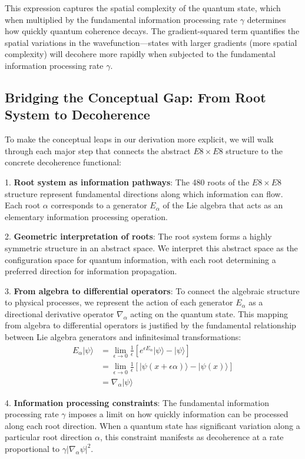 \documentclass[11pt,english,twoside]{article}
\begin{document}
This expression captures the spatial complexity of the quantum state, which when multiplied by the fundamental information processing rate $\gamma$ determines how quickly quantum coherence decays. The gradient-squared term quantifies the spatial variations in the wavefunction—states with larger gradients (more spatial complexity) will decohere more rapidly when subjected to the fundamental information processing rate $\gamma$.

\subsection{Bridging the Conceptual Gap: From Root System to Decoherence}

To make the conceptual leaps in our derivation more explicit, we will walk through each major step that connects the abstract $E8\times E8$ structure to the concrete decoherence functional:

1. \textbf{Root system as information pathways}: The 480 roots of the $E8\times E8$ structure represent fundamental directions along which information can flow. Each root $\alpha$ corresponds to a generator $E_\alpha$ of the Lie algebra that acts as an elementary information processing operation.

2. \textbf{Geometric interpretation of roots}: The root system forms a highly symmetric structure in an abstract space. We interpret this abstract space as the configuration space for quantum information, with each root determining a preferred direction for information propagation.

3. \textbf{From algebra to differential operators}: To connect the algebraic structure to physical processes, we represent the action of each generator $E_\alpha$ as a directional derivative operator $\nabla_\alpha$ acting on the quantum state. This mapping from algebra to differential operators is justified by the fundamental relationship between Lie algebra generators and infinitesimal transformations:
   \begin{align}
   E_\alpha|\psi\rangle &= \lim_{\epsilon \to 0} \frac{1}{\epsilon}[e^{\epsilon E_\alpha}|\psi\rangle - |\psi\rangle]\\
   &= \lim_{\epsilon \to 0} \frac{1}{\epsilon}[|\psi(x + \epsilon\alpha)\rangle - |\psi(x)\rangle]\\
   &= \nabla_\alpha|\psi\rangle
   \end{align}

4. \textbf{Information processing constraints}: The fundamental information processing rate $\gamma$ imposes a limit on how quickly information can be processed along each root direction. When a quantum state has significant variation along a particular root direction $\alpha$, this constraint manifests as decoherence at a rate proportional to $\gamma|\nabla_\alpha\psi|^2$.
\end{document}

